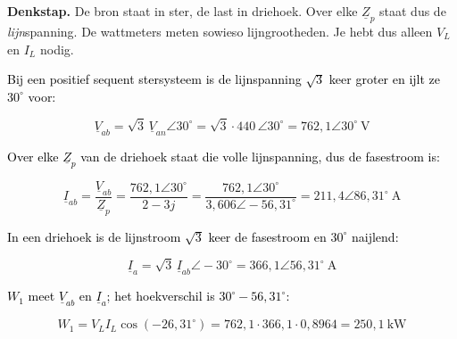 \documentclass[a4paper,11pt]{article}
\newcommand{\stapreden}[1]{\par\vspace{1.4mm}\noindent\textcolor{black}{#1}\par\vspace{-2mm}}
\begin{document}
\begin{oefening}
\begin{center}
    \end{center}

    \textbf{Denkstap.} De bron staat in ster, de last in driehoek. Over elke $\underline{Z}_p$ staat
    dus de \emph{lijn}spanning. De wattmeters meten sowieso lijngrootheden. Je hebt dus alleen
    $V_L$ en $I_L$ nodig.

    \stapreden{Bij een positief sequent stersysteem is de lijnspanning $\sqrt{3}$ keer groter en ijlt ze $30^\circ$ voor:}
    \[\underline{V}_{ab} = \sqrt{3}\,\underline{V}_{an}\angle 30^\circ
        = \sqrt{3}\cdot 440\,\angle 30^\circ = \boxed{762{,}1\angle 30^\circ\ \text{V}}\]

    \stapreden{Over elke $\underline{Z}_p$ van de driehoek staat die volle lijnspanning, dus de fasestroom is:}
    \[\underline{I}_{ab} = \frac{\underline{V}_{ab}}{\underline{Z}_p}
        = \frac{762{,}1\angle 30^\circ}{2-3j}
        = \frac{762{,}1\angle 30^\circ}{3{,}606\angle -56{,}31^\circ}
        = 211{,}4\angle 86{,}31^\circ\ \text{A}\]

    \stapreden{In een driehoek is de lijnstroom $\sqrt{3}$ keer de fasestroom en $30^\circ$ naijlend:}
    \[\underline{I}_a = \sqrt{3}\,\underline{I}_{ab}\angle -30^\circ
        = \boxed{366{,}1\angle 56{,}31^\circ\ \text{A}}\]

    \stapreden{$W_1$ meet $\underline{V}_{ab}$ en $\underline{I}_a$; het hoekverschil is $30^\circ - 56{,}31^\circ$:}
    \[W_1 = V_L I_L \cos(-26{,}31^\circ) = 762{,}1\cdot 366{,}1\cdot 0{,}8964
        = \boxed{250{,}1\ \text{kW}}\]


\end{oefening}
\end{document}
